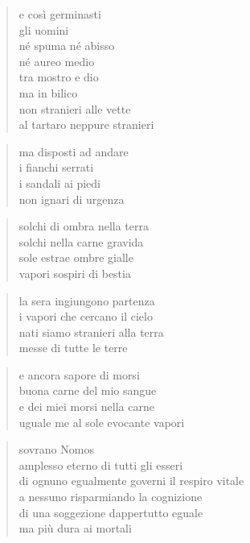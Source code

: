 	\begin{verse}
		e così germinasti\\
		gli uomini\\
		né spuma né abisso\\
		né aureo medio\\
		tra mostro e dio\\
		ma in bilico\\
		non stranieri alle vette\\
		al tartaro neppure stranieri
	\end{verse}

	\begin{verse}
		ma disposti ad andare\\
		i fianchi serrati\\
		i sandali ai piedi\\
		non ignari di urgenza
	\end{verse}


\clearpage



	\begin{verse}
		solchi di ombra nella terra\\
		solchi nella carne gravida\\
		sole estrae ombre gialle\\
		vapori sospiri di bestia
	\end{verse}

	\begin{verse}
		la sera ingiungono partenza\\
		i vapori che cercano il cielo\\
		nati siamo stranieri alla terra\\
		messe di tutte le terre
	\end{verse}

	\begin{verse}
		e ancora sapore di morsi\\
		buona carne del mio sangue\\
		e dei miei morsi nella carne\\
		uguale me al sole evocante vapori
	\end{verse}


\clearpage



	\begin{verse}
		sovrano Nomos\\
		amplesso eterno di tutti gli esseri\\
		di ognuno egualmente governi il respiro vitale\\
		a nessuno risparmiando la cognizione\\
		di una soggezione dappertutto eguale\\
		ma più dura ai mortali
	\end{verse}


